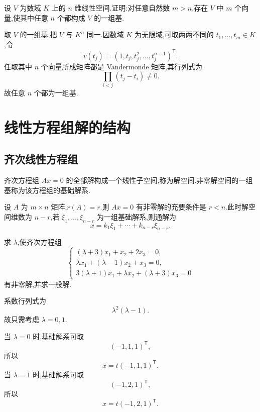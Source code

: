 \begin{example}
设 $V$ 为数域 $K$ 上的 $n$ 维线性空间.证明:对任意自然数 $m>n$,存在 $V$ 中 $m$ 个向量,使其中任意 $n$ 个都构成 $V$ 的一组基.
\end{example}
\exampleblank

\begin{solution}
取 $V$ 的一组基,把 $V$ 与 $K^n$ 同一.因数域 $K$ 为无限域,可取两两不同的 $t_1,\ldots,t_m\in K$,令
\[
v(t_j)=(1,t_j,t_j^2,\ldots,t_j^{n-1})^{\mathsf T}.
\]
任取其中 $n$ 个向量所成矩阵都是 Vandermonde 矩阵,其行列式为
\[
\displaystyle\prod_{i<j}(t_j-t_i)\neq0.
\]
故任意 $n$ 个都为一组基.
\end{solution}


\newpage

\section{线性方程组解的结构}

\subsection{齐次线性方程组}

\begin{definition}
齐次方程组 $Ax=0$ 的全部解构成一个线性子空间,称为解空间.非零解空间的一组基称为该方程组的基础解系.
\end{definition}

\begin{theorem}[\marktwostar]
设 $A$ 为 $m\times n$ 矩阵,$r(A)=r$.则 $Ax=0$ 有非零解的充要条件是 $r<n$.此时解空间维数为 $n-r$,若 $\xi_1,\ldots,\xi_{n-r}$ 为一组基础解系,则通解为
\[
x=k_1\xi_1+\cdots+k_{n-r}\xi_{n-r}.
\]
\end{theorem}

\begin{example}
求 $\lambda$,使齐次方程组
\[
\begin{cases}
(\lambda+3)x_1+x_2+2x_3=0,\\
\lambda x_1+(\lambda-1)x_2+x_3=0,\\
3(\lambda+1)x_1+\lambda x_2+(\lambda+3)x_3=0
\end{cases}
\]
有非零解,并求一般解.
\end{example}
\exampleblank

\begin{solution}
系数行列式为
\[
\lambda^2(\lambda-1).
\]
故只需考虑 $\lambda=0,1$.

当 $\lambda=0$ 时,基础解系可取
\[
(-1,1,1)^{\mathsf T},
\]
所以
\[
x=t(-1,1,1)^{\mathsf T}.
\]
当 $\lambda=1$ 时,基础解系可取
\[
(-1,2,1)^{\mathsf T},
\]
所以
\[
x=t(-1,2,1)^{\mathsf T}.
\]
\end{solution}

